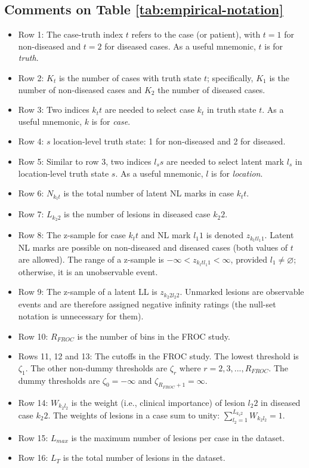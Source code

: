 \documentclass[
]{book}
\begin{document}
\hypertarget{comments-on-table-reftabempirical-notation}{%
\subsection{Comments on Table \ref{tab:empirical-notation}}\label{comments-on-table-reftabempirical-notation}}

\begin{itemize}
\item
  Row 1: The case-truth index \(t\) refers to the case (or patient), with \(t = 1\) for non-diseased and \(t = 2\) for diseased cases. As a useful mnemonic, \(t\) is for \emph{truth}.
\item
  Row 2: \(K_t\) is the number of cases with truth state \(t\); specifically, \(K_1\) is the number of non-diseased cases and \(K_2\) the number of diseased cases.
\item
  Row 3: Two indices \(k_t t\) are needed to select case \(k_t\) in truth state \(t\). As a useful mnemonic, \(k\) is for \emph{case}.
\item
  Row 4: \(s\) location-level truth state: 1 for non-diseased and 2 for diseased.
\item
  Row 5: Similar to row 3, two indices \(l_s s\) are needed to select latent mark \(l_s\) in location-level truth state \(s\). As a useful mnemonic, \(l\) is for \emph{location}.
\item
  Row 6: \(N_{k_t t}\) is the total number of latent NL marks in case \(k_t t\).
\item
  Row 7: \(L_{k_2 2}\) is the number of lesions in diseased case \(k_2 2\).
\item
  Row 8: The z-sample for case \(k_t t\) and NL mark \(l_1 1\) is denoted \(z_{k_t t l_1 1}\). Latent NL marks are possible on non-diseased and diseased cases (both values of \(t\) are allowed). The range of a z-sample is \(-\infty < z_{k_t t l_1 1} < \infty\), provided \(l_1 \neq \varnothing\); otherwise, it is an unobservable event.
\item
  Row 9: The z-sample of a latent LL is \(z_{k_2 2 l_2 2}\). Unmarked lesions are observable events and are therefore assigned negative infinity ratings (the null-set notation is unnecessary for them).
\item
  Row 10: \(R_{FROC}\) is the number of bins in the FROC study.
\item
  Rows 11, 12 and 13: The cutoffs in the FROC study. The lowest threshold is \(\zeta_1\). The other non-dummy thresholds are \(\zeta_r\) where \(r=2,3,...,R_{FROC}\). The dummy thresholds are \(\zeta_0 = -\infty\) and \(\zeta_{R_{FROC}+1} = \infty\).
\item
  Row 14: \(W_{k_2 l_2}\) is the weight (i.e., clinical importance) of lesion \(l_2 2\) in diseased case \(k_2 2\). The weights of lesions in a case sum to unity: \(\sum_{l_2 = 1}^{L_{k_2 2}}W_{k_2 l_2} = 1\).
\item
  Row 15: \(L_{max}\) is the maximum number of lesions per case in the dataset.
\item
  Row 16: \(L_T\) is the total number of lesions in the dataset.
\end{itemize}
\end{document}

